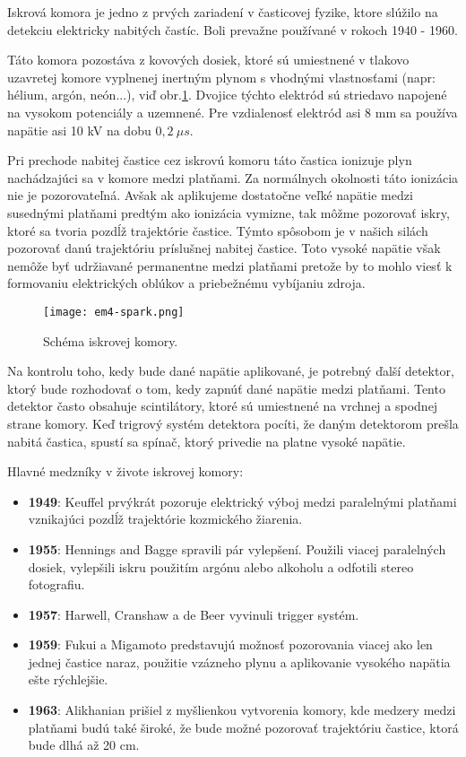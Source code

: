 \documentclass[../../main.tex]{subfiles}
\begin{document}
Iskrová komora je jedno z prvých zariadení v časticovej fyzike, ktore slúžilo na detekciu elektricky nabitých častíc. Boli prevažne používané v rokoch 1940 - 1960.

Táto komora pozostáva z kovových dosiek, ktoré sú umiestnené v tlakovo uzavretej komore vyplnenej inertným plynom s vhodnými vlastnosťami (napr: hélium, argón, neón...), viď obr.\ref{em4:img:spark}. Dvojice týchto elektród sú striedavo napojené na vysokom potenciály a uzemnené. Pre vzdialenosť elektród asi 8 mm sa používa napätie asi 10 kV na dobu $0,2\:\unit{\mu s}$. 

Pri prechode nabitej častice cez iskrovú komoru táto častica ionizuje plyn nachádzajúci sa v komore medzi platňami. Za normálnych okolnosti táto ionizácia nie je pozorovateľná. Avšak ak aplikujeme dostatočne veľké napätie medzi susednými platňami predtým ako ionizácia vymizne, tak môžme pozorovať iskry, ktoré sa tvoria pozdĺž trajektórie častice. Týmto spôsobom je v našich silách pozorovať danú trajektóriu príslušnej nabitej častice. Toto vysoké napätie však nemôže byť udržiavané permanentne medzi platňami pretože by to mohlo viesť k formovaniu elektrických oblúkov a priebežnému vybíjaniu zdroja.

\begin{figure}[h]
\centering
\texttt{[image: em4-spark.png]}
\caption{Schéma iskrovej komory.}
\label{em4:img:spark}
\end{figure}

Na kontrolu toho, kedy bude dané napätie aplikované, je potrebný ďalší detektor, ktorý bude rozhodovať o tom, kedy zapnúť dané napätie medzi platňami. Tento detektor často obsahuje scintilátory, ktoré sú umiestnené na vrchnej a spodnej strane komory. 
Keď trigrový systém detektora pocíti, že daným detektorom prešla nabitá častica, spustí sa spínač, ktorý privedie na platne vysoké napätie.

Hlavné medzníky v živote iskrovej komory:
\begin{itemize}
 \item  \textbf{1949}: Keuffel prvýkrát pozoruje elektrický výboj medzi paralelnými platňami vznikajúci pozdĺž trajektórie kozmického žiarenia.
 \item  \textbf{1955}: Hennings and Bagge spravili pár vylepšení. Použili viacej paralelných dosiek, vylepšili iskru použitím argónu alebo alkoholu a odfotili stereo fotografiu.
 \item  \textbf{1957}: Harwell, Cranshaw a de Beer vyvinuli trigger systém.
 \item  \textbf{1959}: Fukui a Migamoto predstavujú možnosť pozorovania viacej ako len jednej častice naraz, použitie vzázneho plynu a aplikovanie vysokého napätia ešte rýchlejšie.
 \item  \textbf{1963}: Alikhanian prišiel z myšlienkou vytvorenia komory, kde medzery medzi platňami budú také široké, že bude možné pozorovať trajektóriu častice, ktorá bude dlhá až 20 cm.
\end{itemize}
\end{document}
